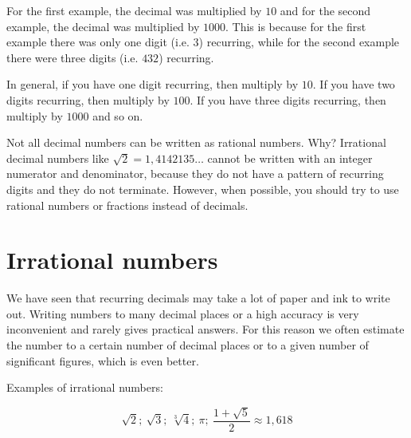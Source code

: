 For the first example, the decimal was multiplied by $10$ and for the second example, the decimal was multiplied by $1000$. This is because for the first example there was only one digit (i.e. $3$) recurring, while for the second example there were three digits (i.e. $432$) recurring.\par 
In general, if you have one digit recurring, then multiply by $10$. If you have two digits recurring, then multiply by $100$. If you have three digits recurring, then multiply by $1000$ and so on.\par

Not all decimal numbers can be written as rational numbers. Why? Irrational decimal numbers like 
$\sqrt{2}=1,4142135\ldots$
cannot be written with an integer numerator and denominator, because they do not have a pattern of recurring digits and they do not terminate. However, when possible, you should try to use rational numbers or fractions instead of decimals.




\section{Irrational numbers}
\setcounter{figure}{1}
\setcounter{subfigure}{1}


We have seen that recurring decimals may take a lot of paper and ink to write out. Writing numbers to many decimal places or a high accuracy is very inconvenient and rarely gives practical answers. For this reason we often estimate the number to a certain number of decimal places or to a given number of significant figures, which is even better.\par 


Examples of irrational numbers:\par 

\begin{equation*}
\sqrt{2};~\sqrt{3};~\sqrt[3]{4};~\pi ;
~\frac{1+\sqrt{5}}{2}\approx 1,618
\end{equation*}





